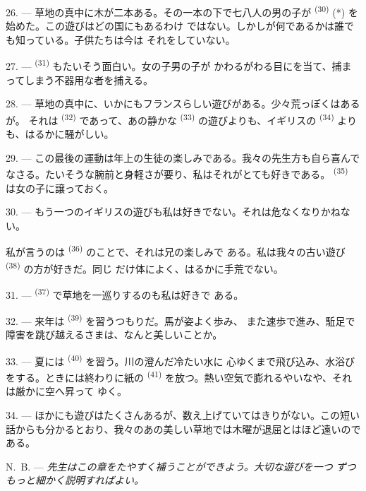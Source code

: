 26. --- 草地の真中に木が二本ある。その一本の下で七八人の男の子が
 \textsuperscript{(30)} (*) を始めた。この遊びはどの国にもあるわけ
ではない。しかしが何であるかは誰でも知っている。子供たちは今は
それをしていない。

\VUsaut{5.0mm}
\VUsaut{3.4mm}

27. ---  \textsuperscript{(31)} もたいそう面白い。女の子男の子が
かわるがわる目にを当て、捕まってしまう不器用な者を捕える。

28. --- 草地の真中に、いかにもフランスらしい遊びがある。少々荒っぽくはあるが。
それは \textsuperscript{(32)} であって、あの静かな
\textsuperscript{(33)} の遊びよりも、イギリスの \textsuperscript{(34)}
よりも、はるかに騒がしい。

29. --- この最後の運動は年上の生徒の楽しみである。我々の先生方も自ら喜んで
なさる。たいそうな腕前と身軽さが要り、私はそれがとても好きである。
 \textsuperscript{(35)} は女の子に譲っておく。

30. --- もう一つのイギリスの遊びも私は好きでない。それは危なくなりかねない。

私が言うのは \textsuperscript{(36)} のことで、それは兄の楽しみで
ある。私は我々の古い遊び \textsuperscript{(38)} の方が好きだ。同じ
だけ体によく、はるかに手荒でない。

\VUsaut{4.6mm}
\VUsaut{3.0mm}

31. ---  \textsuperscript{(37)} で草地を一巡りするのも私は好きで
ある。

32. --- 来年は \textsuperscript{(39)} を習うつもりだ。馬が姿よく歩み、
また速歩で進み、駈足で障害を跳び越えるさまは、なんと美しいことか。

33. --- 夏には \textsuperscript{(40)} を習う。川の澄んだ冷たい水に
心ゆくまで飛び込み、水浴びをする。ときには終わりに紙の
\textsuperscript{(41)} を放つ。熱い空気で膨れるやいなや、それは厳かに空へ昇って
ゆく。

34. --- ほかにも遊びはたくさんあるが、数え上げていてはきりがない。この短い
話からも分かるとおり、我々のあの美しい草地では木曜が退屈とはほど遠いのである。

N.~B. --- \textit{先生はこの章をたやすく補うことができよう。大切な遊びを一つ
ずつもっと細かく説明すればよい。}
\VUsaut{6.0mm}
\VUfilet{22mm}
